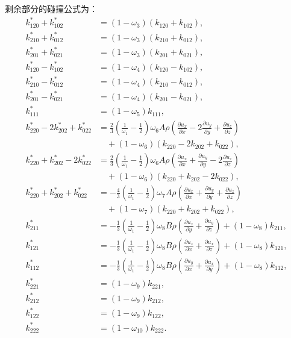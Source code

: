 剩余部分的碰撞公式为：
\begin{align*}
k_{120}^{*}+k_{102}^{*} & =\left(1-\omega_{3}\right)\left(k_{120}+k_{102}\right), \\
k_{210}^{*}+k_{012}^{*} & =\left(1-\omega_{3}\right)\left(k_{210}+k_{012}\right), \\
k_{201}^{*}+k_{021}^{*} & =\left(1-\omega_{3}\right)\left(k_{201}+k_{021}\right), \\
k_{120}^{*}-k_{102}^{*} & =\left(1-\omega_{4}\right)\left(k_{120}-k_{102}\right), \\
k_{210}^{*}-k_{012}^{*} & =\left(1-\omega_{4}\right)\left(k_{210}-k_{012}\right), \\
k_{201}^{*}-k_{021}^{*} & =\left(1-\omega_{4}\right)\left(k_{201}-k_{021}\right), \\
k_{111}^{*} & =\left(1-\omega_{5}\right) k_{111}, \\
k_{220}^{*}-2 k_{202}^{*}+k_{022}^{*} & =\frac{2}{3}\left(\frac{1}{\omega_{1}}-\frac{1}{2}\right) \omega_{6} A \rho\left(\frac{\partial u_x}{\partial x}-2 \frac{\partial u_y}{\partial y}+\frac{\partial u_z}{\partial z}\right) \\
&\quad +\left(1-\omega_{6}\right)\left(k_{220}-2 k_{202}+k_{022}\right), \\
k_{220}^{*}+k_{202}^{*}-2 k_{022}^{*} & =\frac{2}{3}\left(\frac{1}{\omega_{1}}-\frac{1}{2}\right) \omega_{6} A \rho\left(\frac{\partial u_x}{\partial x}+\frac{\partial u_y}{\partial y}-2 \frac{\partial u_z}{\partial z}\right) \\
&\quad +\left(1-\omega_{6}\right)\left(k_{220}+k_{202}-2 k_{022}\right), \\
k_{220}^{*}+k_{202}^{*}+k_{022}^{*} & =-\frac{4}{3}\left(\frac{1}{\omega_{1}}-\frac{1}{2}\right) \omega_{7} A \rho\left(\frac{\partial u_x}{\partial x}+\frac{\partial u_y}{\partial y}+\frac{\partial u_z}{\partial z}\right) \\
&\quad +\left(1-\omega_{7}\right)\left(k_{220}+k_{202}+k_{022}\right), \\
k_{211}^{*} & =-\frac{1}{3}\left(\frac{1}{\omega_{1}}-\frac{1}{2}\right) \omega_{8} B \rho\left(\frac{\partial u_z}{\partial y}+\frac{\partial u_y}{\partial z}\right)+\left(1-\omega_{8}\right) k_{211}, \\
k_{121}^{*} & =-\frac{1}{3}\left(\frac{1}{\omega_{1}}-\frac{1}{2}\right) \omega_{8} B \rho\left(\frac{\partial u_z}{\partial x}+\frac{\partial u_x}{\partial z}\right)+\left(1-\omega_{8}\right) k_{121}, \\
k_{112}^{*} & =-\frac{1}{3}\left(\frac{1}{\omega_{1}}-\frac{1}{2}\right) \omega_{8} B \rho\left(\frac{\partial u_y}{\partial x}+\frac{\partial u_x}{\partial y}\right)+\left(1-\omega_{8}\right) k_{112}, \\
k_{221}^{*} & =\left(1-\omega_{9}\right) k_{221}, \\
k_{212}^{*} & =\left(1-\omega_{9}\right) k_{212}, \\
k_{122}^{*} & =\left(1-\omega_{9}\right) k_{122}, \\
k_{222}^{*} & =\left(1-\omega_{10}\right) k_{222} .
\end{align*}
